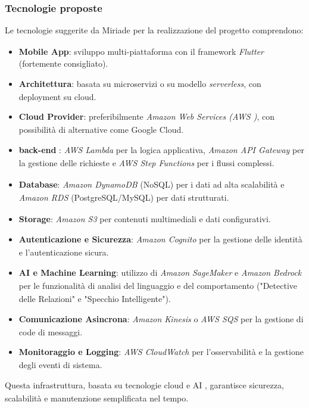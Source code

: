 \documentclass[a4paper,11pt]{article}
\begin{document}
\subsubsection{Tecnologie proposte}
Le tecnologie suggerite da Miriade per la realizzazione del progetto\textsubscript{}
 comprendono:
\begin{itemize}
  \item \textbf{Mobile App}: sviluppo multi-piattaforma con il framework \textit{Flutter} (fortemente consigliato).
  \item \textbf{Architettura}: basata su microservizi\textsubscript{} o su modello \textit{serverless}, con deployment su cloud.
  \item \textbf{Cloud Provider}: preferibilmente \textit{Amazon Web Services (AWS\textsubscript{}
)}, con possibilità di alternative come Google Cloud.
  \item \textbf{back-end\textsubscript{}
}: \textit{AWS\textsubscript{}
 Lambda} per la logica applicativa, \textit{Amazon API\textsubscript{} Gateway} per la gestione delle richieste e \textit{AWS\textsubscript{}
 Step Functions} per i flussi complessi.
  \item \textbf{Database}: \textit{Amazon DynamoDB} (NoSQL) per i dati ad alta scalabilità\textsubscript{} e \textit{Amazon RDS} (PostgreSQL\textsubscript{}/MySQL) per dati strutturati.
  \item \textbf{Storage}: \textit{Amazon S3} per contenuti multimediali e dati configurativi.
  \item \textbf{Autenticazione e Sicurezza\textsubscript{}}: \textit{Amazon Cognito} per la gestione delle identità e l'autenticazione sicura.
  \item \textbf{AI\textsubscript{}
 e Machine Learning}: utilizzo di \textit{Amazon SageMaker} e \textit{Amazon Bedrock\textsubscript{}} per le funzionalità\textsubscript{}
 di analisi del linguaggio e del comportamento ("Detective delle Relazioni" e "Specchio Intelligente").
  \item \textbf{Comunicazione Asincrona}: \textit{Amazon Kinesis} o \textit{AWS\textsubscript{}
 SQS} per la gestione di code di messaggi.
  \item \textbf{Monitoraggio e Logging}: \textit{AWS\textsubscript{}
 CloudWatch} per l'osservabilità e la gestione degli eventi di sistema.
\end{itemize}
Questa infrastruttura, basata su tecnologie cloud e AI\textsubscript{}
, garantisce sicurezza\textsubscript{}, scalabilità\textsubscript{} e manutenzione semplificata nel tempo.
\end{document}
